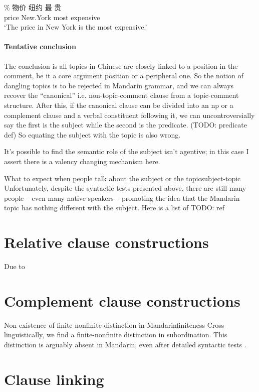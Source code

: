 \documentclass[UTF8, a4paper, oneside, scheme=plain]{ctexrep}
\newcommand{\translate}[1]{`#1'}
\begin{document}
\begin{exe}
    \ex \gll \% 物价 纽约 最 贵  \\
    {} price New.York most expensive \\
    \glt \translate{The price in New York is the most expensive.}
\end{exe}

\subsubsection{Tentative conclusion}

The conclusion is all topics in Chinese are closely linked to a position in the comment,
be it a core argument position or a peripheral one.
So the notion of dangling topics is to be rejected in Mandarin grammar,
and we can always recover the ``canonical'' i.e. non-topic-comment clause
from a topic-comment structure.
After this, if the canonical clause can be divided into an \acs{np}
or a complement clause and a verbal constituent following it,
we can uncontroversially say the first is the subject while the second is the predicate. (TODO: predicate def)
So equating the subject with the topic is also wrong.

It's possible to find the semantic role of the subject isn't agentive;
in this case I assert there is a valency changing mechanism here.

\begin{infobox}{What to expect when people talk about the subject or the topic}{subject-topic}
    Unfortunately, despite the syntactic tests presented above,
    there are still many people -- even many native speakers -- 
    promoting the idea that the Mandarin topic has nothing different with the subject.
    Here is a list of TODO: ref
\end{infobox}

\chapter{Relative clause constructions}

Due to 

\chapter{Complement clause constructions}\label{sec:complement-clause}


\begin{infobox}{Non-existence of finite-nonfinite distinction in Mandarin}{finiteness}
    Cross-linguistically, we find a finite-nonfinite distinction in subordination.
    This distinction is arguably absent in Mandarin,
    even after detailed syntactic tests \citep{no-finite}.
\end{infobox}

\chapter{Clause linking}\label{chap:clause-linking}



\end{document}
